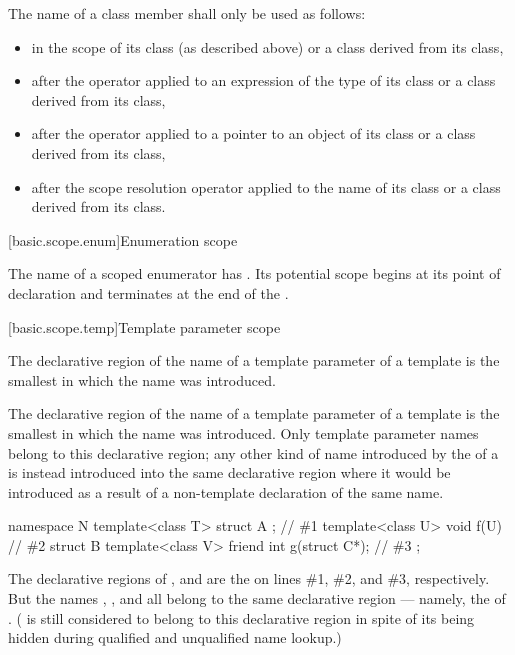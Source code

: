 \pnum
The name of a class member shall only be used as follows:
\begin{itemize}
\item in the scope of its class (as described above) or a class derived
from its class,
\item after the  operator applied to an expression of the type
of its class or a class derived from its class,
\item after the \tcode{->} operator applied to a pointer to an object of
its class or a class derived from its class,
\item after the \tcode{::} scope resolution operator
applied to the name of its class or a class derived from its class.
\end{itemize}

[basic.scope.enum]{Enumeration scope}%
%

\pnum
The name of a scoped enumerator has
. Its potential scope begins at
its point of declaration and terminates at the end of the
.

[basic.scope.temp]{Template parameter scope}%
%
%

\pnum
The declarative region of the name of a template parameter of a template
 is the smallest 
in which the name was introduced.

\pnum
The declarative region of the name of a template parameter of a template is the smallest
 in which the name was introduced. Only template
parameter names belong to this declarative region; any other kind of name introduced by
the  of a  is instead
introduced into the same declarative region where it would be introduced as a result of
a non-template declaration of the same name. \begin{example}

\begin{codeblock}
namespace N {
  template<class T> struct A { };               // \#1
  template<class U> void f(U) { }               // \#2
  struct B {
    template<class V> friend int g(struct C*);  // \#3
  };
}
\end{codeblock}

The declarative regions of ,  and  are the
 on lines \#1, \#2, and \#3,
respectively. But the names , ,  and  all belong to
the same declarative region --- namely, the  of .
( is still considered to belong to this declarative region in spite of its
being hidden during qualified and unqualified name lookup.)
\end{example}

